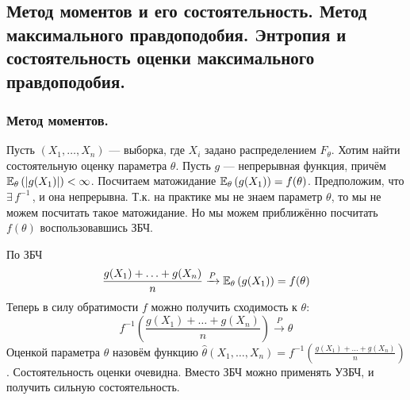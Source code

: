 \subsection{Метод моментов и его состоятельность. Метод максимального правдоподобия. Энтропия и состоятельность оценки максимального правдоподобия.}

\usetikzlibrary{arrows}

\subsubsection{Метод моментов.}
Пусть $(X_1, \ldots, X_n)$ --- выборка, где $X_i$ задано распределением $F_{\theta}$. Хотим найти состоятельную оценку параметра $\theta$.
Пусть $g$ --- непрерывная функция, причём $\mathbb{E}_{\theta}\left( |g(X_1)| \right) < \infty$. Посчитаем матожидание
$\mathbb{E}_{\theta}\left( g(X_1) \right) = f(\theta)$. Предположим, что $\exists\, f^{-1}\,$, и она непрерывна. Т.к. на практике мы не знаем параметр
$\theta$, то мы не можем посчитать такое матожидание. Но мы можем приближённо посчитать $f(\theta)$ воспользовавшись ЗБЧ.

По ЗБЧ
\[
    \frac{g(X_1) + \ldots + g(X_n)}{n} \xrightarrow{P} \mathbb{E}_{\theta}\left( g(X_1) \right) = f(\theta)
\]
Теперь в силу обратимости $f$ можно получить сходимость к $\theta$:
\[
    f^{-1}\left( \frac{g(X_1) + \ldots + g(X_n)}{n} \right) \xrightarrow{P} \theta
\]
Оценкой параметра $\theta$ назовём функцию $\hat{\theta}(X_1, \ldots, X_n) = f^{-1}\left( \frac{g(X_1) + \ldots + g(X_n)}{n} \right)$. Состоятельность
оценки очевидна. Вместо ЗБЧ можно применять УЗБЧ, и получить сильную состоятельность.

